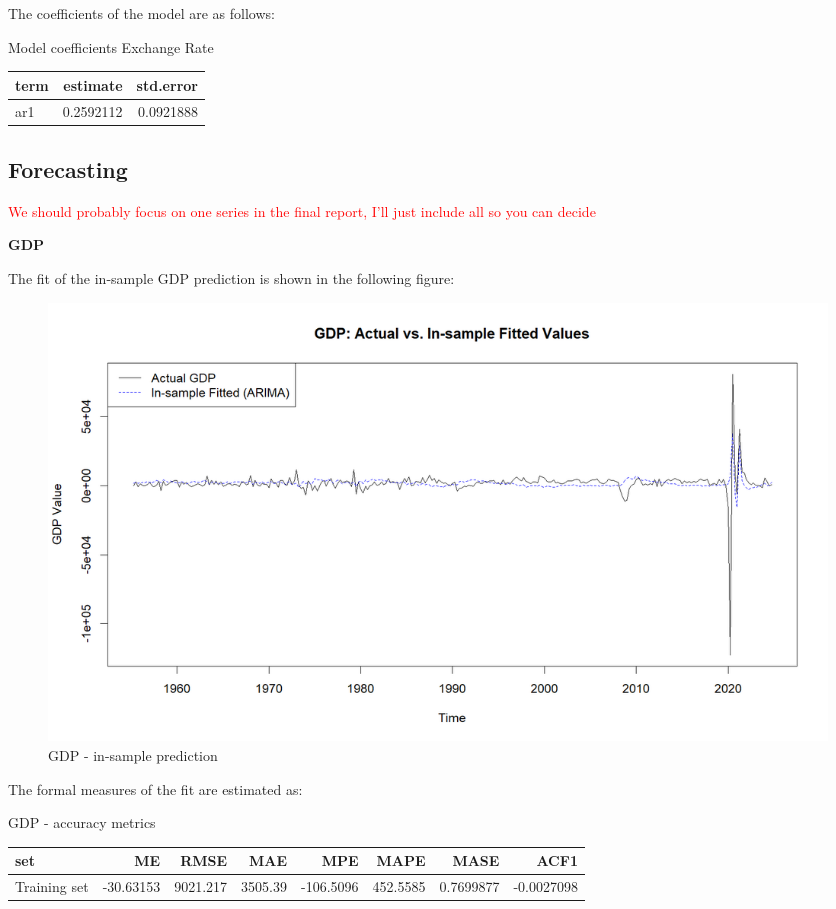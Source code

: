 \documentclass[
]{article}
\begin{document}
The coefficients of the model are as follows:

\bgroup \table[H]
\centering
\caption{\label{tab:unnamed-chunk-13}Model coefficients Exchange Rate}
\centering
\begin{tabular}[t]{lrr}
\toprule
term & estimate & std.error\\
\midrule
ar1 & 0.2592112 & 0.0921888\\
\bottomrule
\end{tabular}
\endtable\egroup

\subsection{Forecasting}

\textcolor{red}{We should probably focus on one series in the final report, I'll just include all so you can decide}

\textbf{GDP}

The fit of the in-sample GDP prediction is shown in the following
figure:

\begin{figure}

{\centering \includegraphics[width=0.8\linewidth]{../results/GDP_fitted_vs_actual} 

}

\caption{GDP - in-sample prediction}\label{fig:unnamed-chunk-14}
\end{figure}

The formal measures of the fit are estimated as:

\bgroup \table[H]
\centering
\caption{\label{tab:unnamed-chunk-15}GDP - accuracy metrics}
\centering
\begin{tabular}[t]{lrrrrrrr}
\toprule
set & ME & RMSE & MAE & MPE & MAPE & MASE & ACF1\\
\midrule
Training set & -30.63153 & 9021.217 & 3505.39 & -106.5096 & 452.5585 & 0.7699877 & -0.0027098\\
\bottomrule
\end{tabular}
\endtable\egroup
\end{document}
